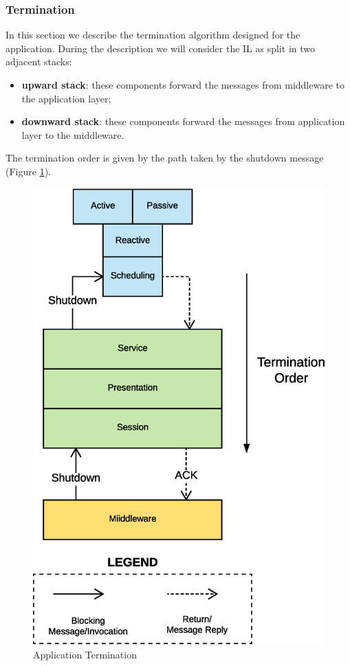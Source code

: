 \subsubsection{Termination}

In this section we describe the termination algorithm designed for the
application.
During the description we will consider the IL as
split in two adjacent stacks:

\begin{itemize}
  \item \textbf{upward stack}: these components forward the messages
  from middleware to the application layer;
  \item \textbf{downward stack}: these components forward the messages
  from application layer to the middleware.
\end{itemize}

The termination order is
given by the path taken by the shutdown message
(Figure \ref{fig:termination-app}).

\begin{figure}[H]
  \centering
  \includegraphics[scale=0.4,keepaspectratio]
    {images/solution/termination-app.eps}
  \caption{Application Termination}
  \label{fig:termination-app}
\end{figure}


